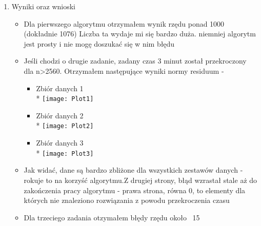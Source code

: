 \documentclass[a4paper, 11pt]{article}
\begin{document}
\begin{enumerate}
\item Wyniki oraz wnioski
\begin{itemize}
\item Dla pierwszego algorytmu otrzymałem wynik rzędu ponad 1000 (dokładnie 1076) Liczba ta wydaje mi się bardzo duża. niemniej algorytm jest prosty i nie mogę doszukać się w nim błędu
\item Jeśli chodzi o drugie zadanie, zadany czas 3 minut został przekroczony dla n>2560. Otrzymałem następujące wyniki normy residuum -
\begin{itemize}
\item Zbiór danych 1 \\* \texttt{[image: Plot1]}
\item Zbiór danych 2 \\* \texttt{[image: Plot2]}
\item Zbiór danych 3 \\* \texttt{[image: Plot3]}
\end{itemize}
\item Jak widać, dane są bardzo zbliżone dla wszystkich zestawów danych - rokuje to na korzyść algorytmu.Z drugiej strony, błąd wzrastał stale aż do zakończenia pracy algorytmu - prawa strona, równa 0, to elementy dla których nie znaleziono rozwiązania z powodu przekroczenia czasu
\item Dla trzeciego zadania otzymałem błędy rzędu około ~15
\end{itemize}
\end{enumerate}
\end{document}
